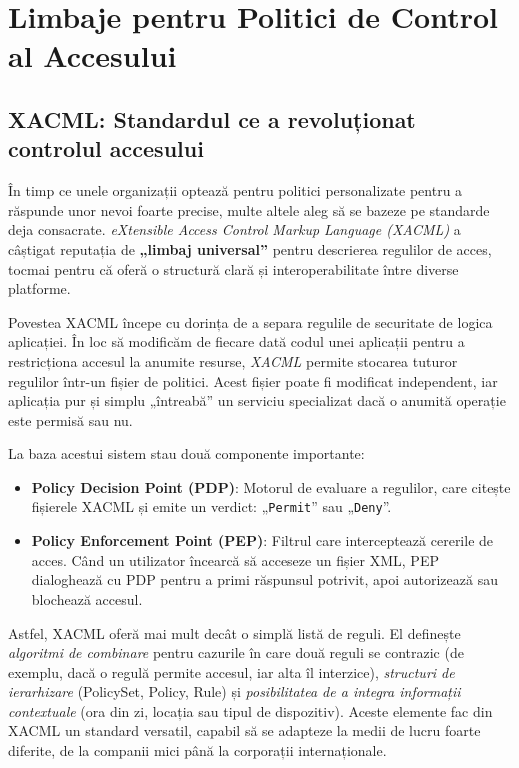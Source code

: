 \documentclass[runningheads]{llncs}
\begin{document}
\section{Limbaje pentru Politici de Control al Accesului}

\subsection{XACML: Standardul ce a revoluționat controlul accesului}
\label{sec:xacml}

În timp ce unele organizații optează pentru politici personalizate pentru a răs\-punde unor nevoi foarte precise, multe altele aleg să se bazeze pe standarde deja consacrate. \emph{eXtensible Access Control Markup Language (XACML)} a câștigat reputația de \textbf{„limbaj universal”} pentru descrierea regulilor de acces, tocmai pentru că oferă o structură clară și interoperabilitate între diverse platforme.

Povestea XACML începe cu dorința de a separa regulile de securitate de logica aplicației. În loc să modificăm de fiecare dată codul unei aplicații pentru a restricționa accesul la anumite resurse, \emph{XACML} permite stocarea tuturor regulilor într-un fișier de politici. Acest fișier poate fi modificat independent, iar aplicația pur și simplu „întreabă” un serviciu specializat dacă o anumită operație este permisă sau nu.

La baza acestui sistem stau două componente importante:
\begin{itemize}
    \item \textbf{Policy Decision Point (PDP)}: Motorul de evaluare a regulilor, care citește fișierele XACML și emite un verdict: „\texttt{Permit}” sau „\texttt{Deny}”.
    \item \textbf{Policy Enforcement Point (PEP)}: Filtrul care interceptează cererile de acces. Când un utilizator încearcă să acceseze un fișier XML, PEP dialoghează cu PDP pentru a primi răspunsul potrivit, apoi autorizează sau blochează accesul.
\end{itemize}

Astfel, XACML oferă mai mult decât o simplă listă de reguli. El definește \emph{algoritmi de combinare} pentru cazurile în care două reguli se contrazic (de exemplu, dacă o regulă permite accesul, iar alta îl interzice), \emph{structuri de ierarhizare} (PolicySet, Policy, Rule) și \emph{posibilitatea de a integra informații contextuale} (ora din zi, locația sau tipul de dispozitiv). Aceste elemente fac din XACML un standard versatil, capabil să se adapteze la medii de lucru foarte diferite, de la companii mici până la corporații internaționale.
\end{document}
